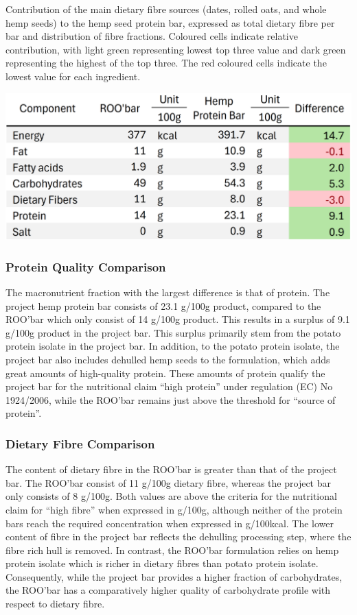 \begin{table}[H]
    \centering
    \caption{Contribution of the main dietary fibre sources (dates, rolled oats, and whole hemp seeds) to the hemp seed protein bar,
    expressed as total dietary fibre per bar and distribution of fibre fractions. Coloured cells indicate relative contribution, with light
    green representing lowest top three value and dark green representing the highest of the top three. The red coloured cells indicate the
    lowest value for each ingredient.}
    \label{tab:fatty_acid_tab_01}
    \includegraphics[width=\textwidth]{Figures/tab_comp_comparison_01.png}
\end{table}

\subsubsection{Protein Quality Comparison}
The macronutrient fraction with the largest difference is that of protein. The project hemp protein bar consists of 23.1 g/100g product, compared to the ROO’bar which only consist of 14 g/100g product. This results in a surplus of 9.1 g/100g product in the project bar. This surplus primarily stem from the potato protein isolate in the project bar. In addition, to the potato protein isolate, the project bar also includes dehulled hemp seeds to the formulation, which adds great amounts of high-quality protein. These amounts of protein qualify the project bar for the nutritional claim “high protein” under regulation (EC) No 1924/2006, while the ROO’bar remains just above the threshold for “source of protein”.

\subsubsection{Dietary Fibre Comparison}
The content of dietary fibre in the ROO’bar is greater than that of the project bar. The ROO’bar consist of 11 g/100g dietary fibre, whereas the project bar only consists of 8 g/100g. Both values are above the criteria for the nutritional claim for “high fibre” when expressed in g/100g, although neither of the protein bars reach the required concentration when expressed in g/100kcal. The lower content of fibre in the project bar reflects the dehulling processing step, where the fibre rich hull is removed. In contrast, the ROO’bar formulation relies on hemp protein isolate which is richer in dietary fibres than potato protein isolate. Consequently, while the project bar provides a higher fraction of carbohydrates, the ROO’bar has a comparatively higher quality of carbohydrate profile with respect to dietary fibre. 

